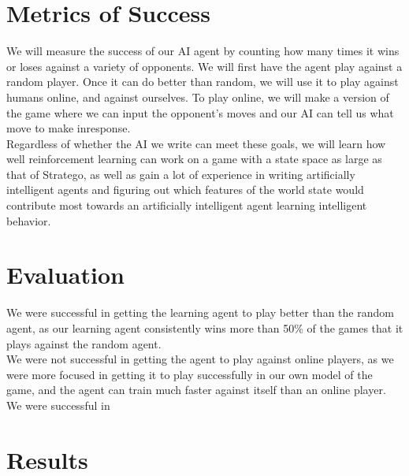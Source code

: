 \documentclass[letterpaper]{article}
\begin{document}
\section{Metrics of Success}
We will measure the success of our AI agent by counting how many times it wins or loses against a variety of opponents. We will first have the agent play against a random player. Once it can do better than random, we will use it to play against humans online, and against ourselves.  To play online, we will make a version of the game where we can input the opponent's moves and our AI can tell us what move to make inresponse.\\

Regardless of whether the AI we write can meet these goals, we will learn how well reinforcement learning can work on a game with a state space as large as that of Stratego, as well as gain a lot of experience in writing artificially intelligent agents and figuring out which features of the world state would contribute most towards an artificially intelligent agent learning intelligent behavior.
\\

\section{Evaluation}
We were successful in getting the learning agent to play better than the random agent, as our learning agent consistently wins more than 50\% of the games that it plays against the random agent.\\

We were not successful in getting the agent to play against online players, as we were more focused in getting it to play successfully in our own model of the game, and the agent can train much faster against itself than an online player.\\

We were successful in

\section{Results}


\end{document}
